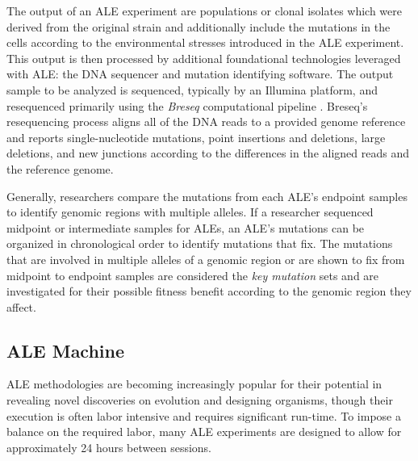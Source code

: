 \documentclass[12pt,final,masters,chapterheads]{ucsd}  %
\begin{document}
The output of an ALE experiment are populations or clonal isolates which were derived from the original strain and additionally include the mutations in the cells according to the environmental stresses introduced in the ALE experiment. This output is then processed by additional foundational technologies leveraged with ALE: the DNA sequencer and mutation identifying software. The output sample to be analyzed is sequenced, typically by an Illumina platform, and resequenced primarily using the \textit{Breseq} computational pipeline \cite{breseq_paper}. Breseq's resequencing process aligns all of the DNA reads to a provided genome reference and reports single-nucleotide mutations, point insertions and deletions, large deletions, and new junctions according to the differences in the aligned reads and the reference genome.

Generally, researchers compare the mutations from each ALE's endpoint samples to identify genomic regions with multiple alleles. If a researcher sequenced midpoint or intermediate samples for ALEs, an ALE's mutations can be organized in chronological order to identify mutations that fix. The mutations that are involved in multiple alleles of a genomic region or are shown to fix from midpoint to endpoint samples are considered the \textit{key mutation} sets and are investigated for their possible fitness benefit according to the genomic region they affect.


\subsection{ALE Machine}

ALE methodologies are becoming increasingly popular for their potential in revealing novel discoveries on evolution and designing organisms, though their execution is often labor intensive and requires significant run-time. To impose a balance on the required labor, many ALE experiments are designed to allow for approximately 24 hours between sessions.
\end{document}
